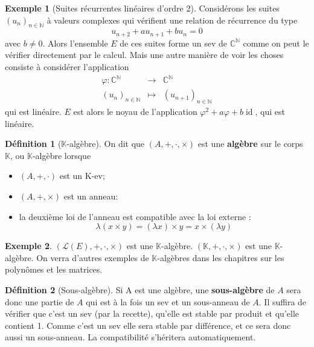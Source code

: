 \documentclass[french]{book}
\newcommand{\N}{\mathbb{N}}
\newcommand{\C}{\mathbb{C}}
\newcommand{\K}{\mathbb{K}}
\theoremstyle{plain}
\theoremstyle{definition}
\newtheorem{dfn}{Définition}[chapter]
\newtheorem{exa}{Exemple}[chapter]
\theoremstyle{remark}
\DeclareMathOperator{\id}{id}
\begin{document}
\begin{exa}[Suites récurrentes linéaires d'ordre 2]
	Considérons les suites $(u_n)_{n \in \mathbb{N}}$ à valeurs complexes qui vérifient une relation de récurrence du type $$u_{n+2} + au_{n+1} + bu_n = 0$$
avec $b \neq 0$. Alors l'ensemble $E$ de ces suites forme un sev de $\mathbb{C}^{\mathbb{N}}$ comme on peut le vérifier directement par le calcul. Mais une autre manière de voir les choses consiste à considérer l'application
$$\begin{array}{ccc}\varphi:\C^\N&\rightarrow&\C^\N \\ (u_n)_{n\in\N}&\mapsto&(u_{n+1})_{n\in\N}\end{array}$$
qui est linéaire. $E$ est alors le noyau de l'application $\varphi^2 + a\varphi + b\id$, qui est linéaire.
\end{exa}
\begin{dfn}[$\K$-algèbre]
	On dit que $(A, +, \cdot, \times)$ est une \textbf{algèbre} sur le corps $\K$, ou $\K$-algèbre lorsque
\begin{itemize}
	\item$(A, +, \cdot)$ est un K-ev;
	\item$(A, +, \times)$ est un anneau:
	\item la deuxième loi de l'anneau est compatible avec la loi externe : $$\lambda(x \times y) = (\lambda x) \times y = x \times (\lambda y)$$
\end{itemize}
\end{dfn}
\begin{exa}
	$(\mathcal{L}(E),+,\cdot,\times)$ est une $\K$-algèbre. $(\K,+,\cdot,\times)$ est une $\K$-algèbre. On verra d'autres exemples de $\K$-algèbres dans les chapitres sur les polynômes et les matrices.
\end{exa}
\begin{dfn}[Sous-algèbre]
	Si A est une algèbre, une \textbf{sous-algèbre} de $A$ sera donc une partie de $A$ qui est à la fois un sev et un sous-anneau de $A$. Il suffira de vérifier que c'est un sev (par la recette), qu'elle est stable par produit et qu'elle contient 1. Comme c'est un sev elle sera stable par différence, et ce sera donc aussi un sous-anneau. La compatibilité s'héritera automatiquement.
\end{dfn}
\end{document}
